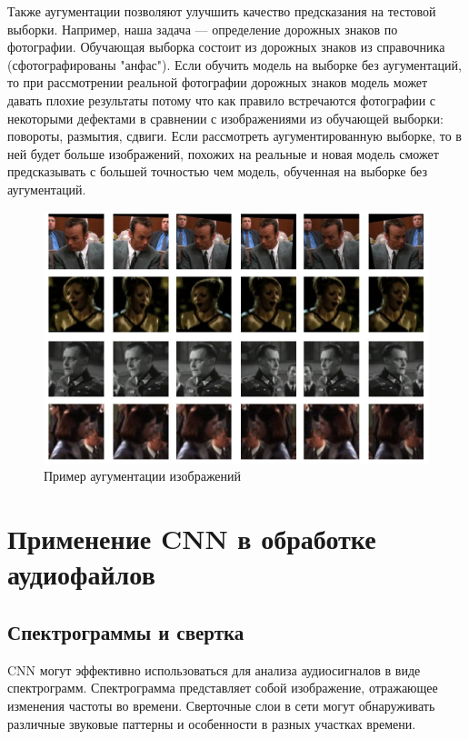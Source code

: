 \documentclass{article}
\theoremstyle{definition}
\theoremstyle{theorem}
\theoremstyle{remark}
\theoremstyle{theorem}
\theoremstyle{example}
\theoremstyle{theorem}
\theoremstyle{theorem}
\theoremstyle{theorem}
\theoremstyle{theorem}
\begin{document}
		Также аугументации позволяют улучшить качество предсказания на тестовой выборки. Например, наша задача --- определение дорожных знаков по фотографии. Обучающая выборка состоит из дорожных знаков из справочника (сфотографированы "анфас"). Если обучить модель на выборке без аугументаций, то при рассмотрении реальной фотографии дорожных знаков модель может давать плохие результаты потому что как правило встречаются фотографии с некоторыми дефектами в сравнении с изображениями из обучающей выборки: повороты, размытия, сдвиги. Если рассмотреть аугументированную выборке, то в ней будет больше изображений, похожих на реальные и новая модель сможет предсказывать с большей точностью чем модель, обученная на выборке без аугументаций.
		\newpage 
		\begin{figure}[h!]
			\includegraphics[width=\textwidth]{aug.png}\caption{Пример аугументации изображений}
		\end{figure}
		\section{Применение CNN в обработке аудиофайлов}
		
		\subsection{Спектрограммы и свертка}
		
		CNN могут эффективно использоваться для анализа аудиосигналов в виде спектрограмм. Спектрограмма представляет собой изображение, отражающее изменения частоты во времени. Сверточные слои в сети могут обнаруживать различные звуковые паттерны и особенности в разных участках времени.\\
		
\end{document}
